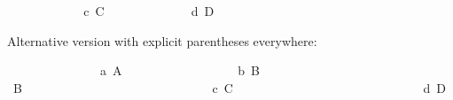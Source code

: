 \begin{isabellebody}
\isanewline
\ \ \ \ \isamarkupfalse%
\isanewline
\ \ \ \ \ \ \isamarkupfalse%
\ c{}\ C\ \isamarkupfalse%
\isanewline
\ \ \ \ \isamarkupfalse%
\isanewline
\ \ \ \ \ \ \isamarkupfalse%
\ d{}\ D\ \isamarkupfalse%
\isanewline
\ \ \ \ \isamarkupfalse%
\isanewline
\ \ \isamarkupfalse%
%
\begin{isamarkuptxt}%
Alternative version with explicit parentheses everywhere:%
\end{isamarkuptxt}%
\isamarkuptrue%
\ \ \isamarkupfalse%
\isanewline
\ \ \ \ \isamarkupfalse%
\isanewline
\ \ \ \ \ \ \isamarkupfalse%
\ a{}\ A\ \isamarkupfalse%
\isanewline
\ \ \ \ \isamarkupfalse%
\isanewline
\ \ \ \ \isamarkupfalse%
\isanewline
\ \ \ \ \ \ \isamarkupfalse%
\ b{}\ B\isanewline
\ \ \ \ \ \ \isamarkupfalse%
\ {}\isanewline
\ \ \ \ \ \ \ \ \isamarkupfalse%
\isanewline
\ \ \ \ \ \ \ \ \ \ \isamarkupfalse%
\ B\ \isamarkupfalse%
\isanewline
\ \ \ \ \ \ \ \ \isamarkupfalse%
\isanewline
\ \ \ \ \ \ \ \ \isamarkupfalse%
\isanewline
\ \ \ \ \ \ \ \ \ \ \isamarkupfalse%
\ c{}\ C\ \isamarkupfalse%
\isanewline
\ \ \ \ \ \ \ \ \isamarkupfalse%
\isanewline
\ \ \ \ \ \ \ \ \isamarkupfalse%
\isanewline
\ \ \ \ \ \ \ \ \ \ \isamarkupfalse%
\ d{}\ D\ \isamarkupfalse%
\isanewline
\ \ \ \ \ \ \ \ \isamarkupfalse%
\isanewline
\ \ \ \ \ \ \isamarkupfalse%
\isanewline
\ \ \ \ \isamarkupfalse%
\isanewline
\ \ \isamarkupfalse%
%
\endisatagproof
{\isafoldproof}%
%
\isadelimproof
\isanewline
%
\endisadelimproof
\isanewline
{}\isamarkupfalse%
\isanewline
%
\isadelimtheory
\isanewline
%
\endisadelimtheory
%
\isatagtheory
{}\isamarkupfalse%
%
\endisatagtheory
{\isafoldtheory}%
%
\isadelimtheory
%
\endisadelimtheory
\end{isabellebody}%
